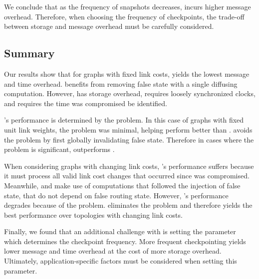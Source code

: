 We conclude that as the frequency of \cpr snapshots decreases, \cpr incurs higher message overhead.  Therefore, when choosing the frequency of checkpoints,
the trade-off between storage and message overhead must be carefully considered. 








\subsection{Summary}
\label{subsec:discuss}

Our results show that for graphs with fixed link costs, \cpr yields the lowest message and time overhead. \cpr benefits from removing false state with a single
diffusing computation. However, \cpr has storage overhead, requires loosely synchronized clocks, and requires the time \bad was compromised be identified.

\seconds's performance is determined by the \infinity problem. In this case of \er graphs with fixed unit link weights, the \infinity problem was minimal, 
helping \second perform better than \purges. \purge avoids the \infinity problem by first globally invalidating false state.  Therefore in cases where the \infinity problem is 
significant, \purge outperforms \seconds.

When considering graphs with changing link costs, \cprs's performance suffers because it must process all valid link cost changes that occurred since \bad was compromised.
Meanwhile, \second and \purge make use of computations that followed the injection of false state, that do not depend on false routing state. However, \seconds's performance degrades 
because of the \infinity problem.  \purge eliminates the \infinity problem and therefore yields the best performance over topologies with changing link costs.

Finally, we found that an additional challenge with \cpr is setting the parameter which determines the checkpoint frequency.
More frequent checkpointing yields lower message and time overhead at the cost of more storage overhead. Ultimately, application-specific factors must be considered
when setting this parameter. 

